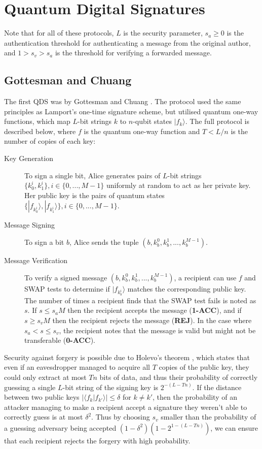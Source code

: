 \documentclass[%
 reprint,
 amsmath,amssymb,
 aps,
 pra,
]{revtex4-1}
\begin{document}
\section{Quantum Digital Signatures}
\label{sec:qds}

Note that for all of these protocols, $L$ is the security parameter, $s_a \geq 0$ is the authentication threshold for authenticating a message from the original author, and $1 > s_v > s_a$ is the threshold for verifying a forwarded message.

\subsection{Gottesman and Chuang}

The first QDS was by Gottesman and Chuang \citep{quant-ph/0105032}. The protocol used the same principles as Lamport's one-time signature scheme, but utilised quantum one-way functions, which map $L$-bit strings $k$ to $n$-qubit states $|f_k\rangle$. The full protocol is described below, where $f$ is the quantum one-way function and $T < L/n$ is the number of copies of each key:

\begin{description}
\item[Key Generation]To sign a single bit, Alice generates pairs of $L$-bit strings $\{k^i_0, k^i_1\}, i \in \{0,...,M-1\}$ uniformly at random to act as her private key. Her public key is the pairs of quantum states $\{|f_{k^i_0}\rangle, |f_{k^i_1}\rangle\}, i \in \{0,...,M-1\}$.
\item[Message Signing]To sign a bit $b$, Alice sends the tuple $(b, k^0_b, k^1_b,...,k^{M-1}_b)$.
\item[Message Verification]To verify a signed message $(b, k^0_b, k^1_b,...,k^{M-1}_b)$, a recipient can use $f$ and SWAP tests \cite{PhysRevLett.87.167902} to determine if $|f_{k^i_b}\rangle$ matches the corresponding public key. The number of times a recipient finds that the SWAP test fails is noted as $s$. If $s \leq s_aM$ then the recipient accepts the message (\textbf{1-ACC}), and if $s \geq s_vM$ then the recipient rejects the message (\textbf{REJ}). In the case where $s_a < s \leq s_v$, the recipient notes that the message is valid but might not be transferable (\textbf{0-ACC}).
\end{description}

Security against forgery is possible due to Holevo's theorem \cite{Hol73}, which states that even if an eavesdropper managed to acquire all $T$ copies of the public key, they could only extract at most $Tn$ bits of data, and thus their probability of correctly guessing a single $L$-bit string of the signing key is $2^{-(L-Tn)}$. If the distance between two public keys $|\langle f_k|f_{k'}\rangle| \leq \delta$ for $k \neq k'$, then the probability of an attacker managing to make a recipient accept a signature they weren't able to correctly guess is at most $\delta^2$. Thus by choosing $s_v$ smaller than the probability of a guessing adversary being accepted $(1 - \delta^2)(1 - 2^{1 - (L-Tn)})$, we can ensure that each recipient rejects the forgery with high probability.
\end{document}
